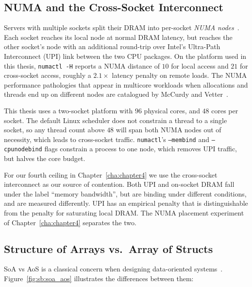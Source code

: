 \subsection{NUMA and the Cross-Socket Interconnect\label{sec:bg:numa}}

Servers with multiple sockets split their DRAM into per-socket \emph{NUMA nodes}~\cite{lameter_2013}. Each socket reaches its local node at normal DRAM latency, but reaches the other socket's node with an additional round-trip over Intel's Ultra-Path Interconnect (UPI) link between the two CPU packages. On the platform used in this thesis, \texttt{numactl -H} reports a NUMA distance of $10$ for local access and $21$ for cross-socket access, roughly a $2.1\times$ latency penalty on remote loads. The NUMA performance pathologies that appear in multicore workloads when allocations and threads end up on different nodes are catalogued by McCurdy and Vetter~\cite{mccurdy_2010}.

This thesis uses a two-socket platform with $96$ physical cores, and $48$ cores per socket. The default Linux scheduler does not constrain a thread to a single socket, so any thread count above $48$ will span both NUMA nodes out of necessity, which leads to cross-socket traffic. \texttt{numactl}'s \texttt{--membind} and \texttt{--cpunodebind} flags constrain a process to one node, which removes UPI traffic, but halves the core budget. 

For our fourth ceiling in Chapter~\ref{cha:chapter4} we use the cross-socket interconnect as our source of contention. Both UPI and on-socket DRAM fall under the label ``memory bandwidth'', but are binding under different conditions, and are measured differently. UPI has an empirical penalty that is distinguishable from the penalty for saturating local DRAM. The NUMA placement experiment of Chapter~\ref{cha:chapter4} separates the two.

\subsection{Structure of Arrays vs.\ Array of Structs\label{sec:sb:layouts}}

SoA vs AoS is a classical concern when designing data-oriented systems~\cite{manegold_2000}. Figure~\ref{fig:sb:soa_aos} illustrates the differences between them:

